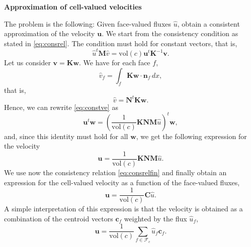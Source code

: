 \documentclass[11pt]{amsart}
\newcommand{\vect}[1]{\boldsymbol{#1}}
\newcommand{\mat}[1]{\boldsymbol{#1}}
\newcommand{\Fcal}{\mathcal{F}}
\begin{document}
\textbf{Approximation of cell-valued velocities}

The problem is the following: Given face-valued fluxes $\hat{u}$, obtain a consistent approximation
of the velocity $\vect{u}$. We start from the consistency condition as stated in
\eqref{eq:consrel}. The condition must hold for constant vectors, that is,
\begin{equation}
  \label{eq:constve}
  \hat{u}^t\mat{M}\hat{v} = \text{vol}(c)\vect{u}^t\mat{K}^{-1}\vect{v}.
\end{equation}
Let us consider $\vect{v} = \mat{K}\vect{w}$. We have for each face $f$,
\begin{equation*}
  \hat{v}_f = \int_f\mat{K}\vect{w}\cdot\vect{n}_f\,dx,
\end{equation*}
that is,
\begin{equation*}
  \hat{v} = \mat{N}^t\mat{K}\vect{w}.
\end{equation*}
Hence, we can rewrite \eqref{eq:constve} as
\begin{equation*}
  \vect{u}^t\vect{w} = \left(\frac{1}{\text{vol}(c)}\mat{K}\mat{N}\mat{M}\hat{u}\right)^t\vect{w},
\end{equation*}
and, since this identity must hold for all $\vect{w}$, we get the following expression for the
velocity
\begin{equation*}
  \vect{u} = \frac{1}{\text{vol}(c)} \mat{K}\mat{N}\mat{M}\hat{u}.
\end{equation*}
We use now the consistency relation \eqref{eq:consrelfin} and finally obtain an expression for the cell-valued
velocity as a function of the face-valued fluxes,
\begin{equation}
  \label{eq:velocapprox}
  \vect{u} = \frac{1}{\text{vol}(c)} \mat{C}\hat{u}.
\end{equation}
A simple interpretation of this expression is that the velocity is obtained as a combination of the
centroid vectors $\vect{c}_f$ weighted by the flux $\hat{u}_f$,
\begin{equation}
  \label{eq:simpleinterpvelapp}
  \vect{u} = \frac{1}{\text{vol}(c)} \sum_{f\in\Fcal_c}\hat{u}_f\vect{c}_f.
\end{equation}

\printbibliography
\end{document}
